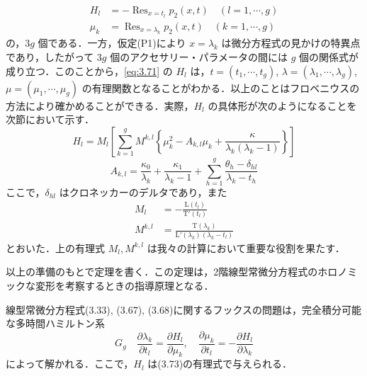 \begin{story}
\begin{align}
H_l &= -\operatorname{Res}_{x=t_l} p_2(x,t) \quad (l = 1, \cdots, g) \label{eq:3.71} \\
\mu_k &= \operatorname{Res}_{x=\lambda_k} p_2(x,t) \quad (k = 1, \cdots, g) \label{eq:3.72}
\end{align}
の，$3g$ 個である．一方，仮定(P1)により $x=\lambda_k$ は微分方程式の見かけの特異点であり，したがって $3g$ 個のアクセサリー・パラメータの間には $g$ 個の関係式が成り立つ．このことから，\eqref{eq:3.71} の $H_l$ は，$t=(t_1,\cdots,t_g)$, $\lambda=(\lambda_1,\cdots,\lambda_g)$, $\mu=(\mu_1,\cdots,\mu_g)$ の有理関数となることがわかる．以上のことはフロベニウスの方法により確かめることができる．実際，$H_l$ の具体形が次のようになることを次節において示す．
\begin{equation}
H_l = M_l \left[ \sum_{k=1}^g M^{k,l} \left\{ \mu_k^2 - A_{k,l}\mu_k + \frac{\kappa}{\lambda_k(\lambda_k-1)} \right\} \right] \label{eq:3.73}
\end{equation}
\begin{equation*}
A_{k,l} = \frac{\kappa_0}{\lambda_k} + \frac{\kappa_1}{\lambda_k-1} + \sum_{h=1}^g \frac{\theta_h - \delta_{hl}}{\lambda_k - t_h}
\end{equation*}
ここで，$\delta_{hl}$ はクロネッカーのデルタであり，また
\begin{align}
M_l &= - \frac{\mathrm{L}(t_l)}{\mathrm{T}'(t_l)} \label{eq:3.74} \\
M^{k,l} &= \frac{\mathrm{T}(\lambda_k)}{\mathrm{L}'(\lambda_k)(\lambda_k - t_l)} \label{eq:3.75}
\end{align}
とおいた．上の有理式 $M_l, M^{k,l}$ は我々の計算において重要な役割を果たす．

以上の準備のもとで定理を書く．この定理は，2階線型常微分方程式のホロノミックな変形を考察するときの指導原理となる．

\begin{theorem}[ガルニエ系のハミルトン系表示]
線型常微分方程式(3.33), (3.67), (3.68)に関するフックスの問題は，完全積分可能な多時間ハミルトン系
\begin{equation*}
G_g \quad \frac{\partial \lambda_k}{\partial t_l} = \frac{\partial H_l}{\partial \mu_k}, \quad \frac{\partial \mu_k}{\partial t_l} = - \frac{\partial H_l}{\partial \lambda_k}
\end{equation*}
によって解かれる．ここで，$H_l$ は(3.73)の有理式で与えられる．
\end{theorem}


\end{story}
